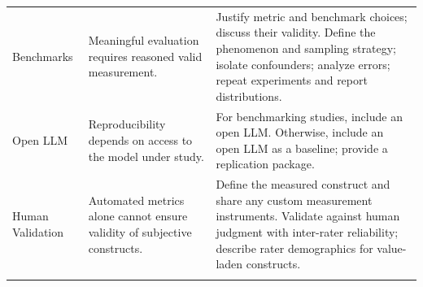 \documentclass[smallextended]{svjour3}
\newcommand{\must}{\textbf{must}\xspace}
\newcommand{\should}{\textbf{should}\xspace}
\newcommand{\paper}{\emph{paper}\xspace}
\newcommand{\paper}{\emph{paper}\xspace}
\newcommand{\iconM}{\usebox{\iconMbox}\xspace}
\newcommand{\iconS}{\usebox{\iconSbox}\xspace}
\newcommand{\iconM}{●\xspace}
\newcommand{\iconS}{○\xspace}
\begin{document}
\begin{appendices}
\begin{center}
\begin{tabularx}{\textwidth}{@{}l>{\raggedright\arraybackslash}X>{\raggedright\arraybackslash}X@{}}
Benchmarks & Meaningful evaluation requires reasoned valid measurement. &
\iconM Justify metric and benchmark choices; discuss their validity.
\newline \iconS Define the phenomenon and sampling strategy; isolate confounders; analyze errors; repeat experiments and report distributions. \\
\addlinespace
Open LLM & Reproducibility depends on access to the model under study. &
\iconM For benchmarking studies, include an open LLM.
\newline \iconS Otherwise, include an open LLM as a baseline; provide a replication package. \\
\addlinespace
Human Validation & Automated metrics alone cannot ensure validity of subjective constructs. &
\iconM Define the measured construct and share any custom measurement instruments.
\newline \iconS Validate against human judgment with inter-rater reliability; describe rater demographics for value-laden constructs. \\
\addlinespace

\end{tabularx}
\end{center}
\end{appendices}
\end{document}
